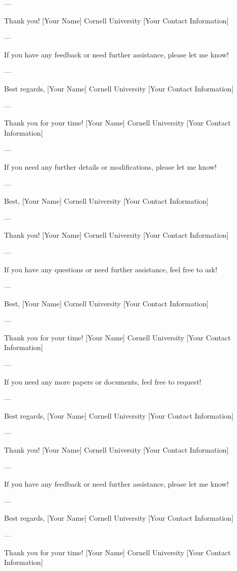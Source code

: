 --- 

Thank you!  
[Your Name]  
Cornell University  
[Your Contact Information]  

--- 

If you have any feedback or need further assistance, please let me know! 

--- 

Best regards,  
[Your Name]  
Cornell University  
[Your Contact Information]  

--- 

Thank you for your time!  
[Your Name]  
Cornell University  
[Your Contact Information]  

--- 

If you need any further details or modifications, please let me know! 

--- 

Best,  
[Your Name]  
Cornell University  
[Your Contact Information]  

--- 

Thank you!  
[Your Name]  
Cornell University  
[Your Contact Information]  

--- 

If you have any questions or need further assistance, feel free to ask! 

--- 

Best,  
[Your Name]  
Cornell University  
[Your Contact Information]  

--- 

Thank you for your time!  
[Your Name]  
Cornell University  
[Your Contact Information]  

--- 

If you need any more papers or documents, feel free to request! 

--- 

Best regards,  
[Your Name]  
Cornell University  
[Your Contact Information]  

--- 

Thank you!  
[Your Name]  
Cornell University  
[Your Contact Information]  

--- 

If you have any feedback or need further assistance, please let me know! 

--- 

Best regards,  
[Your Name]  
Cornell University  
[Your Contact Information]  

--- 

Thank you for your time!  
[Your Name]  
Cornell University  
[Your Contact Information]  

